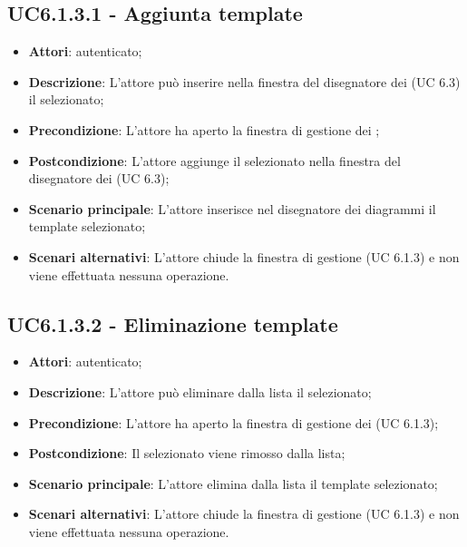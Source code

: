 \subsection{UC6.1.3.1 - Aggiunta template}
\label{ssec:UC6.1.3.1}
\begin{itemize}
\item \textbf{Attori}:  autenticato;
\item \textbf{Descrizione}: L'attore può inserire nella finestra del disegnatore dei  (UC 6.3) il  selezionato;
\item \textbf{Precondizione}: L'attore ha aperto la finestra di gestione dei ;
\item \textbf{Postcondizione}: L'attore aggiunge il  selezionato nella finestra del disegnatore dei (UC 6.3);
\item \textbf{Scenario principale}: L'attore inserisce nel disegnatore dei diagrammi il template selezionato;
\item \textbf{Scenari alternativi}: L'attore chiude la finestra di gestione  (UC 6.1.3) e non viene effettuata nessuna operazione.
\end{itemize}
\subsection{UC6.1.3.2 - Eliminazione template}
\label{ssec:UC6.1.3.2}
\begin{itemize}
\item \textbf{Attori}:  autenticato;
\item \textbf{Descrizione}: L'attore può eliminare dalla lista il  selezionato;
\item \textbf{Precondizione}: L'attore ha aperto la finestra di gestione dei  (UC 6.1.3);
\item \textbf{Postcondizione}: Il  selezionato viene rimosso dalla lista;
\item \textbf{Scenario principale}: L'attore elimina dalla lista il template selezionato;
\item \textbf{Scenari alternativi}: L'attore chiude la finestra di gestione  (UC 6.1.3) e non viene effettuata nessuna operazione.
\end{itemize}
\newpage
